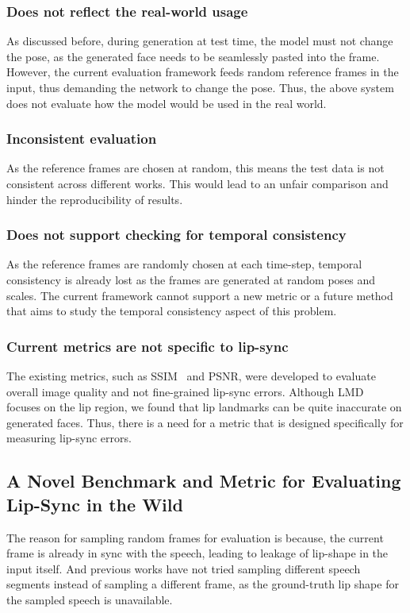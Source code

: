 \documentclass[sigconf]{acmart}
\begin{document}
\subsubsection{Does not reflect the real-world usage} As discussed before, during generation at test time, the model must not change the pose, as the generated face needs to be seamlessly pasted into the frame. However, the current evaluation framework feeds random reference frames in the input, thus demanding the network to change the pose. Thus, the above system does not evaluate how the model would be used in the real world.

\subsubsection{Inconsistent evaluation} As the reference frames are chosen at random, this means the test data is not consistent across different works. This would lead to an unfair comparison and hinder the reproducibility of results.

\subsubsection{Does not support checking for temporal consistency}
As the reference frames are randomly chosen at each time-step, temporal consistency is already lost as the frames are generated at random poses and scales. The current framework cannot support a new metric or a future method that aims to study the temporal consistency aspect of this problem. 

\subsubsection{Current metrics are not specific to lip-sync}
The existing metrics, such as SSIM~\cite{wang2004image} and PSNR, were developed to evaluate overall image quality and not fine-grained lip-sync errors. Although LMD~\cite{chen2018lip} focuses on the lip region, we found that lip landmarks can be quite inaccurate on generated faces. Thus, there is a need for a metric that is designed specifically for measuring lip-sync errors. 

\subsection{A Novel Benchmark and Metric for Evaluating Lip-Sync in the Wild}

The reason for sampling random frames for evaluation is because, the current frame is already in sync with the speech, leading to leakage of lip-shape in the input itself. And previous works have not tried sampling different speech segments instead of sampling a different frame, as the ground-truth lip shape for the sampled speech is unavailable. 
\end{document}
